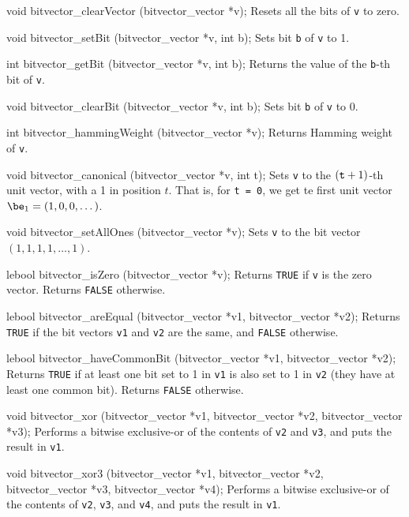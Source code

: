 {void bitvector_clearVector (bitvector_vector *v);
\endcode
 \tab
Resets all the bits of {\tt v} to zero.
 \endtab
\code

void bitvector_setBit (bitvector_vector *v, int b);
\endcode
 \tab
Sets bit {\tt b} of {\tt v} to 1.
 \endtab
\code

int bitvector_getBit (bitvector_vector *v, int b);
\endcode
 \tab
Returns the value of the {\tt b}-th bit of {\tt v}.
 \endtab
\code

void bitvector_clearBit (bitvector_vector *v, int b);
\endcode
 \tab
Sets bit {\tt b} of {\tt v} to 0.
 \endtab
\code

int bitvector_hammingWeight (bitvector_vector *v);
\endcode
 \tab
Returns Hamming weight of {\tt v}.
 \endtab
\code

void bitvector_canonical (bitvector_vector *v, int t);
\endcode
 \tab
Sets {\tt v} to the $({\tt t}+1)$-th unit vector, with a 1 in position $t$.
That is, for {\tt t = 0}, we get te first unit vector $\be_1 = (1,0,0,\dots)$.
 \endtab
\code

void bitvector_setAllOnes (bitvector_vector *v);
\endcode
 \tab
Sets {\tt v} to the bit vector $(1, 1, 1, 1,\dots , 1)$.
 \endtab
\code

lebool bitvector_isZero (bitvector_vector *v);
\endcode
 \tab
Returns {\tt TRUE} if {\tt v} is the zero vector.  Returns {\tt FALSE} otherwise.
\endtab
\code

lebool bitvector_areEqual (bitvector_vector *v1, bitvector_vector *v2);
\endcode
\tab
Returns {\tt TRUE} if the bit vectors {\tt v1} and {\tt v2} are the same,
and {\tt FALSE} otherwise.
\endtab
\code

lebool bitvector_haveCommonBit (bitvector_vector *v1, bitvector_vector *v2);
\endcode
 \tab
Returns {\tt TRUE} if at least one bit set to 1 in {\tt v1} is also set to 1 in {\tt v2}
(they have at least one common bit).  Returns {\tt FALSE} otherwise.
 \endtab
\code

void bitvector_xor (bitvector_vector *v1, bitvector_vector *v2, 
                    bitvector_vector *v3);
\endcode
 \tab
Performs a bitwise exclusive-or of the contents of \texttt{v2} and \texttt{v3},
and puts the result in \texttt{v1}.
\endtab
\code

void bitvector_xor3 (bitvector_vector *v1, bitvector_vector *v2,
                     bitvector_vector *v3, bitvector_vector *v4);
\endcode
 \tab
Performs a bitwise exclusive-or of the contents of \texttt{v2}, \texttt{v3}, and \texttt{v4},
and puts the result in \texttt{v1}.
 \endtab
\code

}

